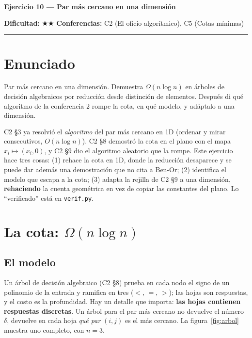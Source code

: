 \documentclass[11pt]{article}
\begin{document}
{\LARGE\bfseries\color{azultitulo} Ejercicio 10 --- Par más cercano en una dimensión}

\vspace{2pt}
\textbf{Dificultad:} $\bigstar\bigstar$ \quad \textbf{Conferencias:} C2 (El oficio algorítmico),
C5 (Cotas mínimas)
\vspace{8pt}
\hrule
\vspace{12pt}

\section*{Enunciado}
\begin{enunciado}
Par más cercano en una dimensión. Demuestra $\Omega(n\log n)$ en árboles de decisión algebraicos por
reducción desde distinción de elementos. Después di qué algoritmo de la conferencia 2 rompe la cota, en
qué modelo, y adáptalo a una dimensión.
\end{enunciado}

C2 §3 ya resolvió el \emph{algoritmo} del par más cercano en 1D (ordenar y mirar consecutivos,
$O(n\log n)$). C2 §8 demostró la cota en el plano con el mapa $x_i\mapsto(x_i,0)$, y C2 §9 dio el algoritmo
aleatorio que la rompe. Este ejercicio hace tres cosas: (1) rehace la cota en 1D, donde la reducción
desaparece y se puede dar además una demostración que no cita a Ben-Or; (2) identifica el modelo que
escapa a la cota; (3) adapta la rejilla de C2 §9 a una dimensión, \textbf{rehaciendo} la cuenta geométrica
en vez de copiar las constantes del plano. Lo ``verificado'' está en \texttt{verif.py}.

\section{La cota: \texorpdfstring{$\Omega(n\log n)$}{Omega(n log n)}}

\subsection*{El modelo}
Un árbol de decisión algebraico (C2 §8) prueba en cada nodo el signo de un polinomio de la entrada y
ramifica en tres ($<$, $=$, $>$); las hojas son respuestas, y el costo es la profundidad. Hay un detalle
que importa: \textbf{las hojas contienen respuestas discretas}. Un árbol para el par más cercano no
devuelve el número $\delta$, devuelve en cada hoja \emph{qué par} $(i,j)$ es el más cercano.
La figura~\ref{fig:arbol} muestra uno completo, con $n=3$.
\end{document}
